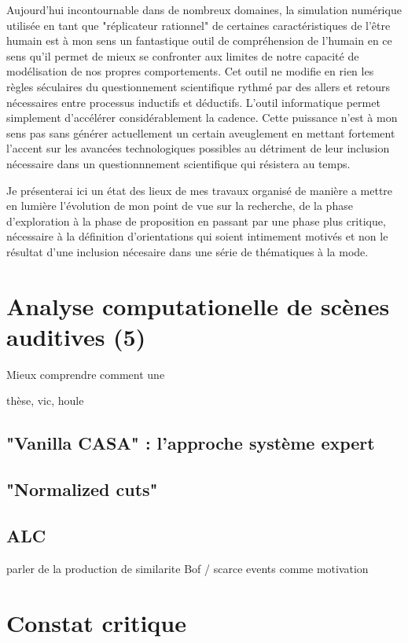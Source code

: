 Aujourd'hui incontournable dans de nombreux domaines, la simulation numérique utilisée en tant que "réplicateur rationnel" de certaines caractéristiques de l'être humain est à mon sens un fantastique outil de compréhension de l'humain en ce sens qu'il permet de mieux se confronter aux limites de notre capacité de modélisation de nos propres comportements. Cet outil ne modifie en rien les règles séculaires du questionnement scientifique rythmé par des allers et retours nécessaires entre processus inductifs et déductifs. L'outil informatique permet simplement d'accélérer considérablement la cadence. Cette puissance n'est à mon sens pas sans générer actuellement un certain aveuglement en mettant fortement l'accent sur les avancées technologiques possibles au détriment de leur inclusion nécessaire dans un questionnnement scientifique qui résistera au temps.

Je présenterai ici un état des lieux de mes travaux organisé de manière a mettre en lumière l'évolution de mon point de vue sur la recherche, de la phase d'exploration à la phase de proposition en passant par une phase plus critique, nécessaire à la définition d'orientations qui soient intimement motivés et non le résultat d'une inclusion nécesaire dans une série de thématiques à la mode.

\section{Analyse computationelle de scènes auditives (5)}

Mieux comprendre comment une

thèse, vic, houle

\subsection{"Vanilla CASA" : l'approche système expert}

\subsection{"Normalized cuts"}

\subsection{ALC}

parler de la production de similarite Bof / scarce events comme motivation



\section{Constat critique}

